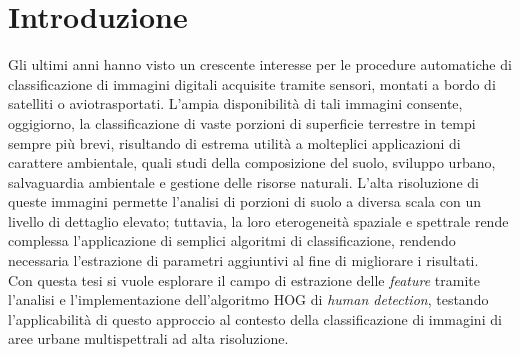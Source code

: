 

\chapter*{Introduzione}
\label{Introduzione}


Gli ultimi anni hanno visto un crescente interesse per le procedure automatiche di classificazione di immagini digitali acquisite tramite sensori, montati a bordo di satelliti o aviotrasportati. 
L'ampia disponibilità di tali immagini consente, oggigiorno, la classificazione di vaste porzioni di superficie terrestre in tempi sempre più brevi, risultando di estrema utilità a molteplici applicazioni di carattere ambientale, quali studi della composizione del suolo, sviluppo urbano, salvaguardia ambientale e gestione delle risorse naturali. 
L'alta risoluzione di queste immagini permette l'analisi di porzioni di suolo a diversa scala con un  livello di dettaglio elevato; tuttavia, la loro eterogeneità spaziale e spettrale rende complessa l'applicazione di semplici algoritmi di classificazione, rendendo necessaria l'estrazione di parametri aggiuntivi al fine di migliorare i risultati.\\
Con questa tesi si vuole esplorare il campo di estrazione delle \emph{feature} tramite l'analisi e l'implementazione dell'algoritmo HOG di \emph{human detection}, testando l'applicabilità di questo approccio al contesto della classificazione di immagini di aree urbane multispettrali ad alta risoluzione.\\

